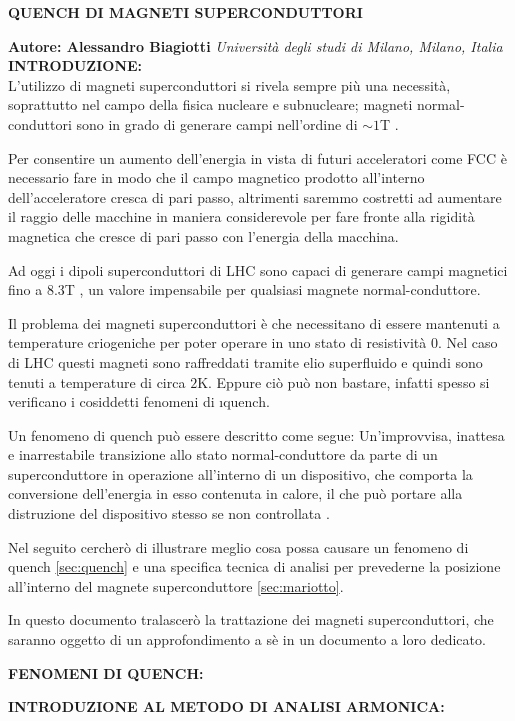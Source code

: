 \documentclass[a4paper,10pt]{article}
\begin{document}
\noindent
\begin{center}
	\textbf{{\Large QUENCH DI MAGNETI SUPERCONDUTTORI}} \\
\end{center}

\noindent
\textbf{Autore: Alessandro Biagiotti} \hfill \textit{Università degli studi di Milano, Milano, Italia}
\\

\noindent
{}
\makeatletter\def\@currentlabel{\texttt{(I)}}\makeatother
\label{sec:intro}
\textbf{INTRODUZIONE:}
\\
L'utilizzo di magneti superconduttori si rivela sempre più una necessità, soprattutto nel campo
della fisica nucleare e subnucleare; magneti normal-conduttori sono in grado di generare campi
nell'ordine di $\sim 1$T \cite{magnets}.

Per consentire un aumento dell'energia in vista di futuri acceleratori come FCC è necessario fare in
modo che il campo magnetico prodotto all'interno dell'acceleratore cresca di pari passo, altrimenti
saremmo costretti ad aumentare il raggio delle macchine in maniera considerevole per fare fronte
alla rigidità magnetica che cresce di pari passo con l'energia della macchina.

Ad oggi i dipoli superconduttori di LHC sono capaci di generare campi magnetici fino a $8.3$T
\cite{lhc-field}, un valore impensabile per qualsiasi magnete normal-conduttore.

Il problema dei magneti superconduttori è che necessitano di essere mantenuti a temperature
criogeniche per poter operare in uno stato di resistività $0$. Nel caso di LHC questi magneti sono
raffreddati tramite elio superfluido e quindi sono tenuti a temperature di circa $2$K. Eppure ciò
può non bastare, infatti spesso si verificano i cosiddetti fenomeni di \i{quench}.

Un fenomeno di quench può essere descritto come segue: Un'improvvisa, inattesa e inarrestabile
transizione allo stato normal-conduttore da parte di un superconduttore in operazione all'interno di
un dispositivo, che comporta la conversione dell'energia in esso contenuta in calore, il che può
portare alla distruzione del dispositivo stesso se non controllata \cite{quench-pres}.

Nel seguito cercherò di illustrare meglio cosa possa causare un fenomeno di quench
\ref{sec:quench} e una specifica tecnica di analisi per prevederne la posizione all'interno del
magnete superconduttore \ref{sec:mariotto}.

In questo documento tralascerò la trattazione dei magneti superconduttori, che saranno oggetto di un
approfondimento a sè in un documento a loro dedicato.

\bigskip
{}
\makeatletter\def\@currentlabel{\texttt{(II)}}\makeatother
\label{sec:quench}
\noindent
\textbf{FENOMENI DI QUENCH:}

\bigskip
{}
\makeatletter\def\@currentlabel{\texttt{(III)}}\makeatother
\label{sec:mariotto}
\noindent
\textbf{INTRODUZIONE AL METODO DI ANALISI ARMONICA:}

\clearpage


\end{document}
